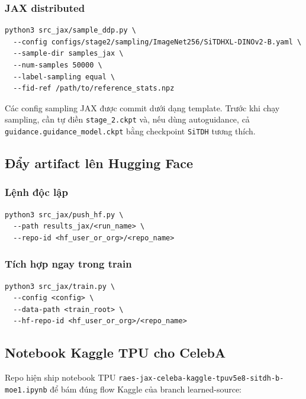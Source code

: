 \subsubsection{JAX distributed}

\begin{lstlisting}[style=rae]
python3 src_jax/sample_ddp.py \
  --config configs/stage2/sampling/ImageNet256/SiTDHXL-DINOv2-B.yaml \
  --sample-dir samples_jax \
  --num-samples 50000 \
  --label-sampling equal \
  --fid-ref /path/to/reference_stats.npz
\end{lstlisting}

Các config sampling JAX được commit dưới dạng template. Trước khi chạy sampling,
cần tự điền \texttt{stage\_2.ckpt} và, nếu dùng autoguidance, cả
\texttt{guidance.guidance\_model.ckpt} bằng checkpoint \texttt{SiTDH} tương
thích.

\subsection{Đẩy artifact lên Hugging Face}

\subsubsection{Lệnh độc lập}

\begin{lstlisting}[style=rae]
python3 src_jax/push_hf.py \
  --path results_jax/<run_name> \
  --repo-id <hf_user_or_org>/<repo_name>
\end{lstlisting}

\subsubsection{Tích hợp ngay trong train}

\begin{lstlisting}[style=rae]
python3 src_jax/train.py \
  --config <config> \
  --data-path <train_root> \
  --hf-repo-id <hf_user_or_org>/<repo_name>
\end{lstlisting}

\subsection{Notebook Kaggle TPU cho CelebA}

Repo hiện ship notebook TPU
\texttt{raes-jax-celeba-kaggle-tpuv5e8-sitdh-b-moe1.ipynb} để bám đúng flow
Kaggle của branch learned-source:

